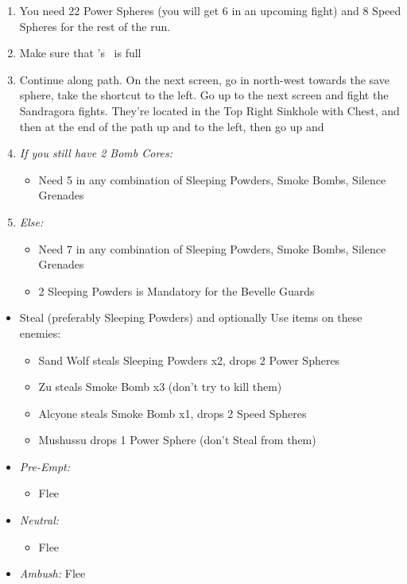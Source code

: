 \begin{enumerate}[resume]
	\item You need 22 Power Spheres (you will get 6 in an upcoming fight) and 8 Speed Spheres for the rest of the run.
	\item Make sure that \rikku's \od\ is full
	\item Continue along path. On the next screen, go in north-west towards the save sphere, take the shortcut to the left. Go up to the next screen and fight the Sandragora fights. They're located in the Top Right Sinkhole with Chest, and then at the end of the path up and to the left, then go up and \sd
	\item \textit{If you still have 2 Bomb Cores:}
	      \begin{itemize}
		      \item Need 5 in any combination of Sleeping Powders, Smoke Bombs, Silence Grenades
	      \end{itemize}
	\item \textit{Else:}
	      \begin{itemize}
		      \item Need 7 in any combination of Sleeping Powders, Smoke Bombs, Silence Grenades
		      \item 2 Sleeping Powders is Mandatory for the Bevelle Guards
	      \end{itemize}
\end{enumerate}
\winvfill
\begin{encounters}
	\begin{itemize}
		\item Steal (preferably Sleeping Powders) and optionally Use items on these enemies:
		\begin{itemize}
			\item Sand Wolf steals Sleeping Powders x2, drops 2 Power Spheres
			\item Zu steals Smoke Bomb x3 (don't try to kill them)
			\item Alcyone steals Smoke Bomb x1, drops 2 Speed Spheres
			\item Mushussu drops 1 Power Sphere (don't Steal from them)
		\end{itemize}
		\item \textit{Pre-Empt:}
		      \begin{itemize}
			      \tidusf Defend
			      \rikkuf Steal or Use a Smoke Bomb/Silence Grenade/Sleeping Powder
			      \auronf Defend
			      \item Flee
		      \end{itemize}
		\item \textit{Neutral:}
		      \begin{itemize}
			      \switch{\tidus}{\kimahri}
			      \kimahrif Steal
				  \rikkuf Switch for \tidus or Use a Smoke Bomb/Silence Grenade/Sleeping Powder
			      \item Flee
		      \end{itemize}
		\item \textit{Ambush:} Flee
	\end{itemize}
\end{encounters}
